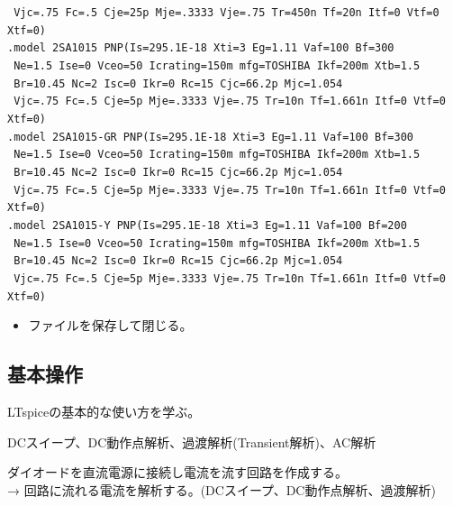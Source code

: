 \begin{enumerate}
\verb| Vjc=.75 Fc=.5 Cje=25p Mje=.3333 Vje=.75 Tr=450n Tf=20n Itf=0 Vtf=0 Xtf=0)|\\
\verb|.model 2SA1015 PNP(Is=295.1E-18 Xti=3 Eg=1.11 Vaf=100 Bf=300|\\ 
\verb| Ne=1.5 Ise=0 Vceo=50 Icrating=150m mfg=TOSHIBA Ikf=200m Xtb=1.5|\\
\verb| Br=10.45 Nc=2 Isc=0 Ikr=0 Rc=15 Cjc=66.2p Mjc=1.054|\\
\verb| Vjc=.75 Fc=.5 Cje=5p Mje=.3333 Vje=.75 Tr=10n Tf=1.661n Itf=0 Vtf=0 Xtf=0)|\\
\verb|.model 2SA1015-GR PNP(Is=295.1E-18 Xti=3 Eg=1.11 Vaf=100 Bf=300|\\
\verb| Ne=1.5 Ise=0 Vceo=50 Icrating=150m mfg=TOSHIBA Ikf=200m Xtb=1.5|\\
\verb| Br=10.45 Nc=2 Isc=0 Ikr=0 Rc=15 Cjc=66.2p Mjc=1.054|\\
\verb| Vjc=.75 Fc=.5 Cje=5p Mje=.3333 Vje=.75 Tr=10n Tf=1.661n Itf=0 Vtf=0 Xtf=0)|\\
\verb|.model 2SA1015-Y PNP(Is=295.1E-18 Xti=3 Eg=1.11 Vaf=100 Bf=200|\\
\verb| Ne=1.5 Ise=0 Vceo=50 Icrating=150m mfg=TOSHIBA Ikf=200m Xtb=1.5|\\
\verb| Br=10.45 Nc=2 Isc=0 Ikr=0 Rc=15 Cjc=66.2p Mjc=1.054|\\
\verb| Vjc=.75 Fc=.5 Cje=5p Mje=.3333 Vje=.75 Tr=10n Tf=1.661n Itf=0 Vtf=0 Xtf=0)|
    \begin{itemize}
      \item ファイルを保存して閉じる。
    \end{itemize}
\end{enumerate}

\subsection{基本操作}
\begin{description}
  \setlength{\parskip}{0cm} %
  \setlength{\itemsep}{0cm} %
  \item[ゴール] LTspiceの基本的な使い方を学ぶ。
  \item[キーワード] DCスイープ、DC動作点解析、過渡解析(Transient解析)、AC解析
  \item[ストーリー] ダイオードを直流電源に接続し電流を流す回路を作成する。\\ → 回路に流れる電流を解析する。(DCスイープ、DC動作点解析、過渡解析)
\end{description}

